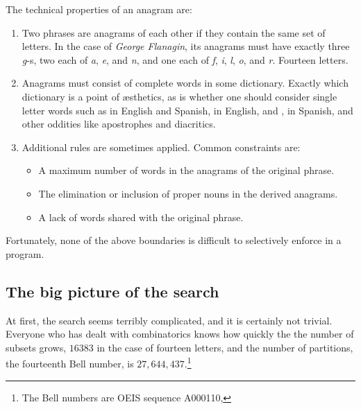 \documentclass[letterpaper, 11pt]{article}
\begin{document}
The technical properties of an anagram are:

\begin{enumerate}
\item Two phrases are anagrams of each other if they contain the
same set of letters. In the case of \emph{George Flanagin}, its
anagrams must have exactly three \emph{g}-s, two each of \emph{a},
\emph{e}, and \emph{n}, and one each of \emph{f}, \emph{i}, \emph{l},
\emph{o}, and \emph{r}.  Fourteen letters.

\item Anagrams must consist of complete words in some dictionary.
Exactly which dictionary is a point of {\ae}sthetics, as is whether
one should consider single letter words such as  in English
and Spanish,  in English, and ,  in Spanish,
and other oddities like apostrophes and diacritics.

\item Additional rules are sometimes applied. Common constraints are:

\begin{itemize}
\item A maximum number of words in the anagrams of the original phrase.

\item The elimination or inclusion of proper nouns in the derived
anagrams.

\item A lack of words shared with the original phrase.
\end{itemize}
\end{enumerate}

Fortunately, none of the above boundaries is difficult to selectively
enforce in a program. 

\subsection{The big picture of the search}
\label{sec:bigpicture}

At first, the search seems terribly complicated, and it is certainly
not trivial. Everyone who has dealt with combinatorics knows how
quickly the the number of subsets grows, $16383$ in the case of
fourteen letters, and the number of partitions, the fourteenth Bell
number, is $27,644,437$.\footnote{The Bell numbers are OEIS sequence
A000110, }
\end{document}
